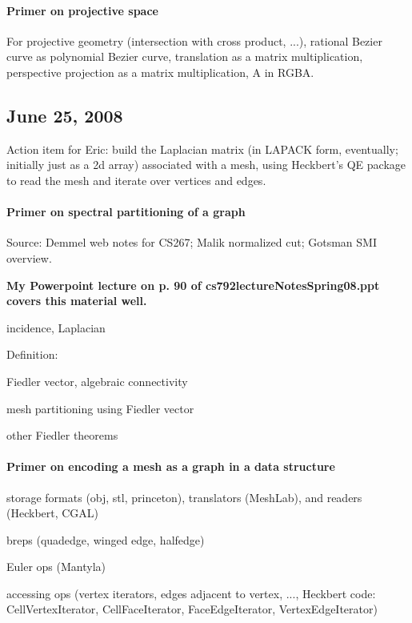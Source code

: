 \documentclass[11pt]{article}
\begin{document}
\paragraph{Primer on projective space}

For projective geometry (intersection with cross product, ...), rational Bezier curve as
polynomial Bezier curve, translation as a matrix multiplication, perspective projection
as a matrix multiplication, A in RGBA.

\subsection{June 25, 2008}

Action item for Eric: 
build the Laplacian matrix (in LAPACK form, eventually; initially just as a 2d array) 
associated with a mesh, using Heckbert's QE package to read the mesh 
and iterate over vertices and edges.

\paragraph{Primer on spectral partitioning of a graph}

Source: Demmel web notes for CS267; Malik normalized cut; Gotsman SMI overview.

{\bf My Powerpoint lecture on p. 90 of cs792lectureNotesSpring08.ppt covers this material well.}

incidence, Laplacian

Definition:

Fiedler vector, algebraic connectivity

mesh partitioning using Fiedler vector

other Fiedler theorems

\paragraph{Primer on encoding a mesh as a graph in a data structure}

storage formats (obj, stl, princeton), translators (MeshLab), and readers (Heckbert, CGAL)

breps (quadedge, winged edge, halfedge)

Euler ops (Mantyla)

accessing ops (vertex iterators, edges adjacent to vertex, ..., 
               Heckbert code: 
               CellVertexIterator, CellFaceIterator, FaceEdgeIterator, VertexEdgeIterator)
\end{document}
